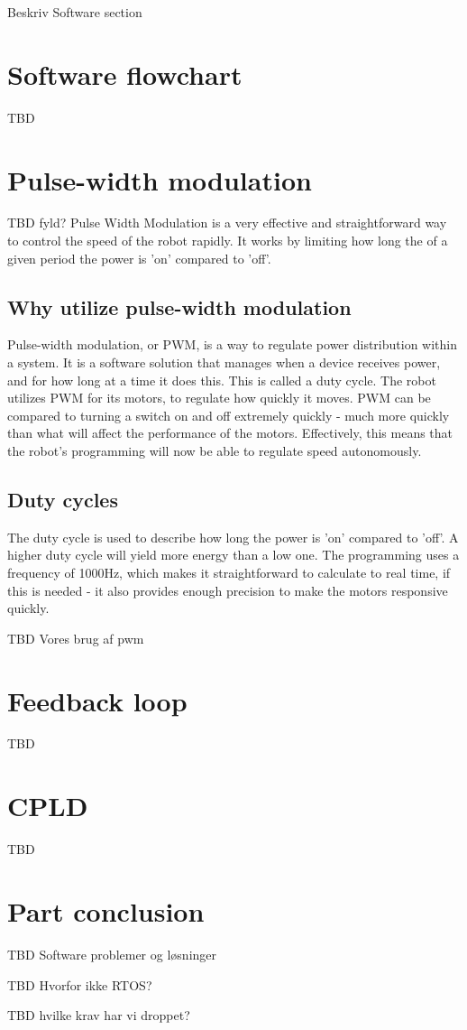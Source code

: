 
Beskriv Software section

\section{Software flowchart}
TBD
\section{Pulse-width modulation}
TBD fyld?
Pulse Width Modulation is a very effective and straightforward way to control the speed of the robot rapidly. It works by limiting how long the of a given period the power is 'on' compared to 'off'.

\subsection {Why utilize pulse-width modulation}

Pulse-width modulation, or PWM, is a way to regulate power distribution within a system. It is a software solution that manages when a device receives power, and for how long at a time it does this. This is called a duty cycle. The robot utilizes PWM for its motors, to regulate how quickly it moves. PWM can be compared to turning a switch on and off extremely quickly - much more quickly than what will affect the performance of the motors. Effectively, this means that the robot's programming will now be able to regulate speed autonomously. 
 
\subsection {Duty cycles}

The duty cycle is used to describe how long the power is 'on' compared to 'off'. A higher duty cycle will yield more energy than a low one. The programming uses a frequency of 1000Hz, which makes it straightforward to calculate to real time, if this is needed - it also provides enough precision to make the motors responsive quickly.

TBD Vores brug af pwm

\section{Feedback loop}
TBD
\section{CPLD}
TBD
\section{Part conclusion}
TBD Software problemer og løsninger

TBD Hvorfor ikke RTOS?

TBD hvilke krav har vi droppet?